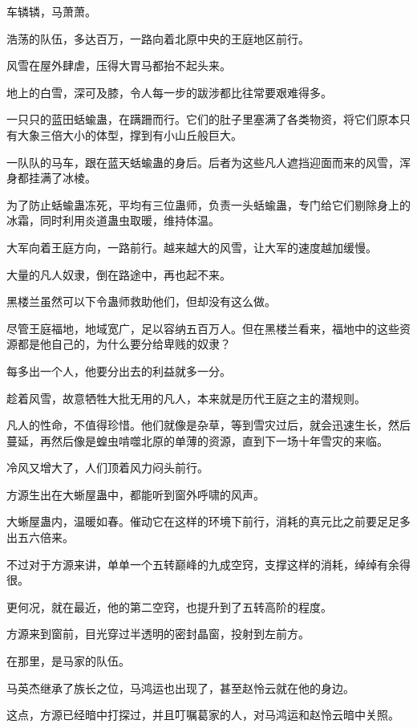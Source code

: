 
\begin{this_body}

车辚辚，马萧萧。

浩荡的队伍，多达百万，一路向着北原中央的王庭地区前行。

风雪在屋外肆虐，压得大胃马都抬不起头来。

地上的白雪，深可及膝，令人每一步的跋涉都比往常要艰难得多。

一只只的蓝田蛞蝓蛊，在蹒跚而行。它们的肚子里塞满了各类物资，将它们原本只有大象三倍大小的体型，撑到有小山丘般巨大。

一队队的马车，跟在蓝天蛞蝓蛊的身后。后者为这些凡人遮挡迎面而来的风雪，浑身都挂满了冰棱。

为了防止蛞蝓蛊冻死，平均有三位蛊师，负责一头蛞蝓蛊，专门给它们剔除身上的冰霜，同时利用炎道蛊虫取暖，维持体温。

大军向着王庭方向，一路前行。越来越大的风雪，让大军的速度越加缓慢。

大量的凡人奴隶，倒在路途中，再也起不来。

黑楼兰虽然可以下令蛊师救助他们，但却没有这么做。

尽管王庭福地，地域宽广，足以容纳五百万人。但在黑楼兰看来，福地中的这些资源都是他自己的，为什么要分给卑贱的奴隶？

每多出一个人，他要分出去的利益就多一分。

趁着风雪，故意牺牲大批无用的凡人，本来就是历代王庭之主的潜规则。

凡人的性命，不值得珍惜。他们就像是杂草，等到雪灾过后，就会迅速生长，然后蔓延，再然后像是蝗虫啃噬北原的单薄的资源，直到下一场十年雪灾的来临。

冷风又增大了，人们顶着风力闷头前行。

方源生出在大蜥屋蛊中，都能听到窗外呼啸的风声。

大蜥屋蛊内，温暖如春。催动它在这样的环境下前行，消耗的真元比之前要足足多出五六倍来。

不过对于方源来讲，单单一个五转巅峰的九成空窍，支撑这样的消耗，绰绰有余得很。

更何况，就在最近，他的第二空窍，也提升到了五转高阶的程度。

方源来到窗前，目光穿过半透明的密封晶窗，投射到左前方。

在那里，是马家的队伍。

马英杰继承了族长之位，马鸿运也出现了，甚至赵怜云就在他的身边。

这点，方源已经暗中打探过，并且叮嘱葛家的人，对马鸿运和赵怜云暗中关照。


\end{this_body}
